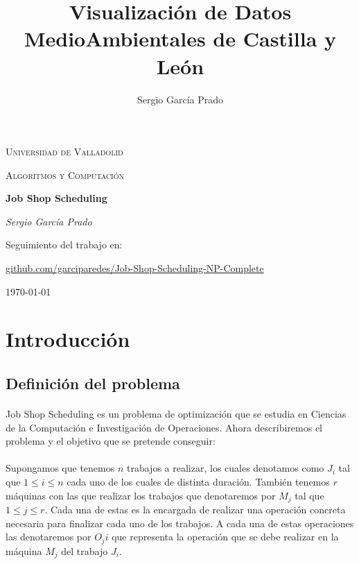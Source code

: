 \documentclass[11pt, a4paper,spanish]{article}
\title{Visualización de Datos MedioAmbientales de Castilla y León}
\author{Sergio García Prado}
\begin{document}
	\begin{titlepage}
		\centering
		{\scshape\LARGE Universidad de Valladolid \par}
		
		\vspace{1cm}
		{\scshape\Large Algoritmos y Computación\par}
		
		\vspace{1.5cm}
		{\huge\bfseries Job Shop Scheduling\par}
		
		\vspace{2cm}
		{\Large\itshape Sergio García Prado\par}

		\vfill
		Seguimiento del trabajo en: \par
		\href{https://github.com/garciparedes/Job-Shop-Scheduling-NP-Complete}{github.com/garciparedes/Job-Shop-Scheduling-NP-Complete}
		\vfill

		{\large \today\par}
	\end{titlepage}

	\newpage
		\tableofcontents
	\newpage
	
		\section{Introducción}
		
			\subsection{Definición del problema}
			
				\paragraph{}
				Job Shop Scheduling es un problema de optimización que se estudia en Ciencias de la Computación e Investigación de Operaciones. Ahora describiremos el problema y el objetivo que se pretende conseguir:
			
				\paragraph{}
				Supongamos que tenemos $n$ trabajos a realizar, los cuales denotamos como $J_{i}$ tal que $1 \leq i \leq n$ cada uno de los cuales de distinta duración. También tenemos $r$ máquinas con las que realizar los trabajos que denotaremos por $M_{j}$ tal que $1 \leq j \leq r$. Cada una de estas es la encargada de realizar una operación concreta necesaria para finalizar cada uno de los trabajos. A cada una de estas operaciones las denotaremos por  $O_{j}{i}$ que representa la operación que se debe realizar en la máquina  $M_{j}$ del trabajo $J_{i}$.
\end{document}
